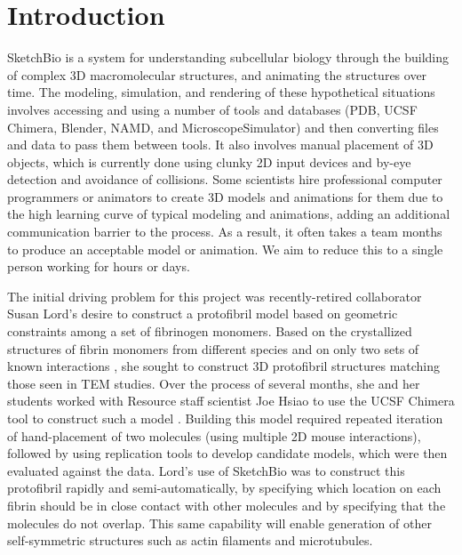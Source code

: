 \documentclass{article} %
\begin{document}
\section{Introduction}
SketchBio is a system for understanding subcellular biology through the building of complex 3D macromolecular structures, and animating the structures over time.   The modeling, simulation, and rendering of these hypothetical situations involves accessing and using a number of tools and databases (PDB, UCSF Chimera, Blender, NAMD, and MicroscopeSimulator) and then converting files and data to pass them between tools.  It also involves manual placement of 3D objects, which is currently done using clunky 2D input devices and by-eye detection and avoidance of collisions.  Some scientists hire professional computer programmers or animators to create 3D models and animations for them due to the high learning curve of typical modeling and animations, adding an additional communication barrier to the process.  As a result, it often takes a team months to produce an acceptable model or animation.  We aim to reduce this to a single person working for hours or days.

The initial driving problem for this project was recently-retired collaborator Susan Lord’s desire to construct a protofibril model based on geometric constraints among a set of fibrinogen monomers.  Based on the crystallized structures of fibrin monomers from different species and on only two sets of known interactions \cite{lord2007fibrinogen}, she sought to construct 3D protofibril structures matching those seen in TEM studies.  Over the process of several months, she and her students worked with Resource staff scientist Joe Hsiao to use the UCSF Chimera tool to construct such a model \cite{lordSubmitted}.  Building this model required repeated iteration of hand-placement of two molecules (using multiple 2D mouse interactions), followed by using replication tools to develop candidate models, which were then evaluated against the data.  Lord’s use of SketchBio was to construct this protofibril rapidly and semi-automatically, by specifying which location on each fibrin should be in close contact with other molecules and by specifying that the molecules do not overlap.  This same capability will enable generation of other self-symmetric structures such as actin filaments and microtubules.
\end{document}
